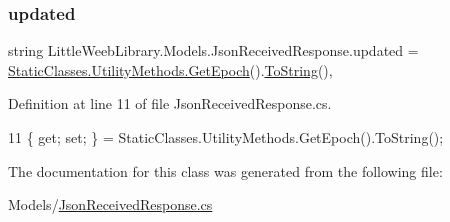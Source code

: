 \subsubsection{\texorpdfstring{updated}{updated}}
{\footnotesize\ttfamily string Little\+Weeb\+Library.\+Models.\+Json\+Received\+Response.\+updated = \mbox{\hyperlink{class_little_weeb_library_1_1_static_classes_1_1_utility_methods_a12336d9e64983ddabaad8950486fafb2}{Static\+Classes.\+Utility\+Methods.\+Get\+Epoch}}().\mbox{\hyperlink{class_little_weeb_library_1_1_models_1_1_json_received_response_a396aa50a773bcd751e23cc7d61db34be}{To\+String}}()\hspace{0.3cm}{\ttfamily [get]}, {\ttfamily [set]}}



Definition at line 11 of file Json\+Received\+Response.\+cs.


\begin{DoxyCode}
11 \{ \textcolor{keyword}{get}; \textcolor{keyword}{set}; \} = StaticClasses.UtilityMethods.GetEpoch().ToString();
\end{DoxyCode}


The documentation for this class was generated from the following file\+:\begin{DoxyCompactItemize}
\item 
Models/\mbox{\hyperlink{_json_received_response_8cs}{Json\+Received\+Response.\+cs}}\end{DoxyCompactItemize}
